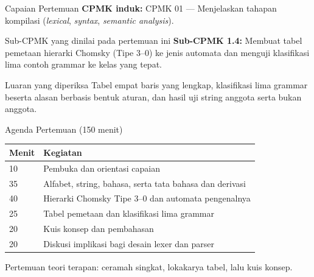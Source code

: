 \documentclass[aspectratio=169,10pt,t]{beamer}
\begin{document}

\begin{frame}{Capaian Pertemuan}
  \textbf{CPMK induk:} CPMK 01 --- Menjelaskan tahapan kompilasi
  (\textit{lexical}, \textit{syntax}, \textit{semantic analysis}).

  \vspace{4pt}
  \begin{block}{Sub-CPMK yang dinilai pada pertemuan ini}
    \small
    \textbf{Sub-CPMK 1.4:} Membuat tabel pemetaan hierarki Chomsky
    (Tipe 3--0) ke jenis automata dan menguji klasifikasi lima contoh
    grammar ke kelas yang tepat.
  \end{block}

  \vspace{4pt}
  \begin{exampleblock}{Luaran yang diperiksa}
    \footnotesize
    Tabel empat baris yang lengkap, klasifikasi lima grammar beserta
    alasan berbasis bentuk aturan, dan hasil uji string anggota serta
    bukan anggota.
  \end{exampleblock}
\end{frame}

\begin{frame}{Agenda Pertemuan (150 menit)}
  \small
  \begin{tabular}{@{}p{1.4cm}p{12.3cm}@{}}
    \toprule
    \textbf{Menit} & \textbf{Kegiatan} \\
    \midrule
    10 & Pembuka dan orientasi capaian \\
    35 & Alfabet, string, bahasa, serta tata bahasa dan derivasi \\
    40 & Hierarki Chomsky Tipe 3--0 dan automata pengenalnya \\
    25 & Tabel pemetaan dan klasifikasi lima grammar \\
    20 & Kuis konsep dan pembahasan \\
    20 & Diskusi implikasi bagi desain lexer dan parser \\
    \bottomrule
  \end{tabular}

  \vspace{6pt}
  {\scriptsize\color{ubbblue!75}Pertemuan teori terapan: ceramah singkat,
  lokakarya tabel, lalu kuis konsep.}
\end{frame}
\end{document}
